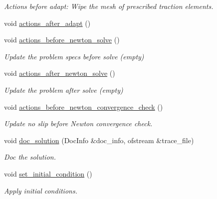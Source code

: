 \begin{DoxyCompactItemize}
\begin{DoxyCompactList}\small\item\em Actions before adapt\+: Wipe the mesh of prescribed traction elements. \end{DoxyCompactList}\item 
void \hyperlink{classFSICollapsibleChannelProblem_ae20eb7ed895e0063ade5a6d0c6f9af2f}{actions\+\_\+after\+\_\+adapt} ()
\item 
void \hyperlink{classFSICollapsibleChannelProblem_ad10b2d12be052c6b1bc5005dc27cd229}{actions\+\_\+before\+\_\+newton\+\_\+solve} ()
\begin{DoxyCompactList}\small\item\em Update the problem specs before solve (empty) \end{DoxyCompactList}\item 
void \hyperlink{classFSICollapsibleChannelProblem_a49780267c05f4c6ecbed11bfc6b9956b}{actions\+\_\+after\+\_\+newton\+\_\+solve} ()
\begin{DoxyCompactList}\small\item\em Update the problem after solve (empty) \end{DoxyCompactList}\item 
void \hyperlink{classFSICollapsibleChannelProblem_ace5343d2e6e6e0480d077d4f17365288}{actions\+\_\+before\+\_\+newton\+\_\+convergence\+\_\+check} ()
\begin{DoxyCompactList}\small\item\em Update no slip before Newton convergence check. \end{DoxyCompactList}\item 
void \hyperlink{classFSICollapsibleChannelProblem_aff5cacbc8d81f6c1beda947085496462}{doc\+\_\+solution} (Doc\+Info \&doc\+\_\+info, ofstream \&trace\+\_\+file)
\begin{DoxyCompactList}\small\item\em Doc the solution. \end{DoxyCompactList}\item 
void \hyperlink{classFSICollapsibleChannelProblem_afdd6752cb134fd09ee8830158ed557b2}{set\+\_\+initial\+\_\+condition} ()
\begin{DoxyCompactList}\small\item\em Apply initial conditions. \end{DoxyCompactList}\end{DoxyCompactItemize}
